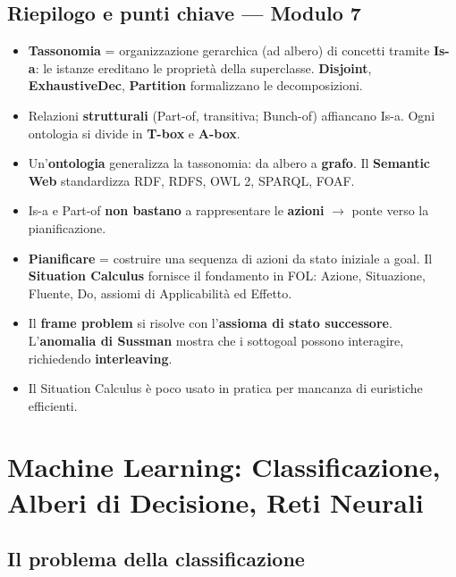 \documentclass[11pt,a4paper]{report}
\begin{document}
\section*{Riepilogo e punti chiave --- Modulo 7}

\begin{itemize}
  \item \textbf{Tassonomia} = organizzazione gerarchica (ad albero) di concetti tramite \textbf{Is-a}: le istanze ereditano le proprietà della superclasse. \textbf{Disjoint}, \textbf{ExhaustiveDec}, \textbf{Partition} formalizzano le decomposizioni.
  \item Relazioni \textbf{strutturali} (Part-of, transitiva; Bunch-of) affiancano Is-a. Ogni ontologia si divide in \textbf{T-box} e \textbf{A-box}.
  \item Un'\textbf{ontologia} generalizza la tassonomia: da albero a \textbf{grafo}. Il \textbf{Semantic Web} standardizza RDF, RDFS, OWL 2, SPARQL, FOAF.
  \item Is-a e Part-of \textbf{non bastano} a rappresentare le \textbf{azioni} $\to$ ponte verso la pianificazione.
  \item \textbf{Pianificare} = costruire una sequenza di azioni da stato iniziale a goal. Il \textbf{Situation Calculus} fornisce il fondamento in FOL: Azione, Situazione, Fluente, $\text{Do}$, assiomi di Applicabilità ed Effetto.
  \item Il \textbf{frame problem} si risolve con l'\textbf{assioma di stato successore}. L'\textbf{anomalia di Sussman} mostra che i sottogoal possono interagire, richiedendo \textbf{interleaving}.
  \item Il Situation Calculus è poco usato in pratica per mancanza di euristiche efficienti.
\end{itemize}

\chapter{Machine Learning: Classificazione, Alberi di Decisione, Reti Neurali}

\section{Il problema della classificazione}
\end{document}
